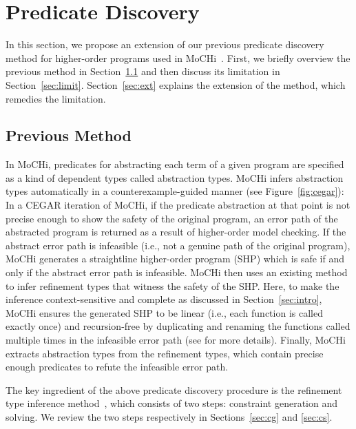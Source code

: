 

\section{Predicate Discovery}
\label{sec:refine}

In this section, we propose an extension of our previous predicate
discovery method for higher-order programs used in
MoCHi~\cite{KobayashiPLDI2011}.  First, we briefly overview the previous
method in Section~\ref{sec:prev} and then discuss its limitation in
Section~\ref{sec:limit}. Section~\ref{sec:ext} explains the extension of
the method, which remedies the limitation.

\subsection{Previous Method}
\label{sec:prev}

In MoCHi, predicates for abstracting each term of a given program are 
specified as a kind of dependent types called abstraction types.  MoCHi 
infers abstraction types automatically in a counterexample-guided manner 
(see Figure~\ref{fig:cegar}): In a CEGAR iteration of MoCHi, if the 
predicate abstraction at that point is not precise enough to show the 
safety of the original program, an error path of the abstracted program 
is returned as a result of higher-order model checking.  If the abstract 
error path is infeasible (i.e., not a genuine path of the original 
program), MoCHi generates a straightline higher-order program (SHP) 
which is safe if and only if the abstract error path is infeasible.  
MoCHi then uses an existing method~\cite{Unno2009} to infer refinement 
types that witness the safety of the SHP.  Here, to make the inference 
context-sensitive and complete as discussed in Section~\ref{sec:intro}, 
MoCHi ensures the generated SHP to be linear (i.e., each function is 
called exactly once) and recursion-free by duplicating and renaming the 
functions called multiple times in the infeasible error path (see 
\cite{KobayashiPLDI2011} for more details).  Finally, MoCHi extracts 
abstraction types from the refinement types, which contain precise 
enough predicates to refute the infeasible error path.

The key ingredient of the above predicate discovery procedure is the 
refinement type inference method~\cite{Unno2009}, which consists of two 
steps: constraint generation and solving.  We review the two steps 
respectively in Sections~\ref{sec:cg} and \ref{sec:cs}.

